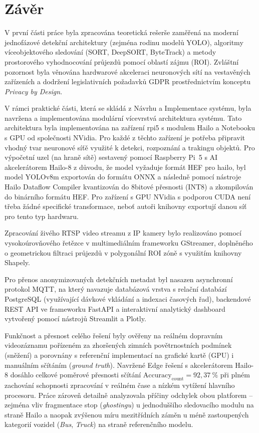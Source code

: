 \documentclass[male,czech,api_bc]{kitheses}
\begin{document}
\chapter{Závěr}
V první části práce byla zpracována teoretická rešerše zaměřená na moderní jednofázové detekční architektury (zejména rodinu modelů YOLO), algoritmy víceobjektového sledování (SORT, DeepSORT, ByteTrack) a metody prostorového vyhodnocování průjezdů pomocí oblastí zájmu (ROI). Zvláštní pozornost byla věnována hardwarové akceleraci neuronových sítí na vestavěných zařízeních a dodržení legislativních požadavků GDPR prostřednictvím konceptu \textit{Privacy by Design}.

V rámci praktické části, která se skládá z Návrhu a Implementace systému, byla navržena a implementována modulární vícevrstvá architektura systému. Tato architektura byla implementována na zařízení rpi5 s modulem Hailo a Notebooku s GPU od společnosti NVidia. Pro každé z těchto zařízení je potřeba připravit vhodný tvar neuronové síťě využité k detekci, rozpoznání a trakingu objektů. Pro výpočetní uzel (na hraně sítě) sestavený pomocí Raspberry Pi~5 s AI akcelerátorem Hailo-8 z důvodu, že model vyžaduje formát HEF pro hailo, byl model YOLOv8m exportován do formátu ONNX a následně pomocí nástroje Hailo Dataflow Compiler kvantizován do 8bitové přesnosti (INT8) a zkompilován do binárního formátu HEF. Pro zařízení s GPU NVidia s podporou CUDA není třeba žádné specifické transformace, neboť autoři knihovny exportují danou síť pro tento typ hardwaru. 

Zpracování živého RTSP video streamu z IP kamery bylo realizováno pomocí vysokoúrovňového řetězce v multimediálním frameworku GStreamer, doplněného o geometrickou filtraci průjezdů v polygonální ROI zóně s využitím knihovny Shapely. 

Pro přenos anonymizovaných detekčních metadat byl nasazen asynchronní protokol MQTT, na který navazuje databázová vrstva s relační databází PostgreSQL (využívající dávkové vkládání a indexaci časových řad), backendové REST API ve frameworku FastAPI a interaktivní analytický dashboard vytvořený pomocí nástrojů Streamlit a Plotly.

Funkčnost a přesnost celého řešení byly ověřeny na reálném dopravním videozáznamu pořízeném za zhoršených zimních povětrnostních podmínek (sněžení) a porovnány s referenční implementací na grafické kartě (GPU) i manuálním sčítáním (\textit{ground truth}). Navržené Edge řešení s akcelerátorem Hailo-8 dosáhlo celkové poměrové přesnosti sčítání $\text{Accuracy}_{\text{count}} = 92{,}37~\%$ při plném zachování schopnosti zpracování v reálném čase a nízkém vytížení hlavního procesoru. Práce zároveň detailně analyzovala příčiny odchylek obou platforem – zejména vliv fragmentace stop (\textit{ghostingu}) u jednoduššího sledovacího modulu na straně Hailo a naopak zvýšenou míru mezitřídních záměn u méně zastoupených kategorií vozidel (\textit{Bus}, \textit{Truck}) na straně referenčního modelu.
\end{document}
